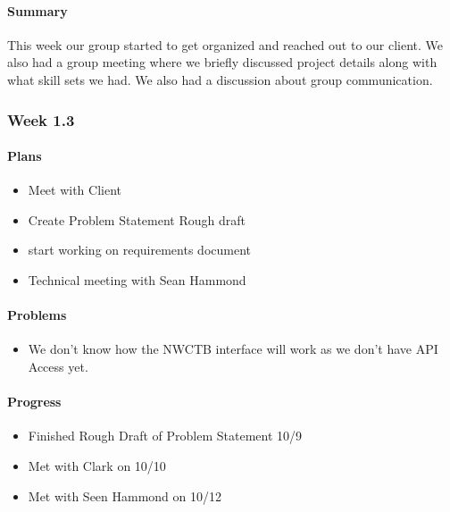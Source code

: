 \documentclass[onecolumn, draftclsnofoot,10pt, compsoc]{article}
\begin{document}
		    \paragraph{Summary} \hfill \break
		         This week our group started to get organized and reached out to our client. We also had a group meeting where we briefly discussed project details along with what skill sets we had. We also had a discussion about group communication.\\

		\subsubsection{Week 1.3}

		    \paragraph{Plans} \hfill \break

		        \begin{itemize}
		            \item Meet with Client
		            \item Create Problem Statement Rough draft
		            \item start working on requirements document
		            \item Technical meeting with Sean Hammond
		        \end{itemize}

		    \paragraph{Problems} \hfill \break

		    \begin{itemize}
		        \item We don't know how the NWCTB interface will work as we don't have API Access yet.
		    \end{itemize}

		    \paragraph{Progress} \hfill \break

		    \begin{itemize}
		        \item Finished Rough Draft of Problem Statement 10/9
		        \item Met with Clark on 10/10
		        \item Met with Seen Hammond on 10/12
		    \end{itemize}
\end{document}
